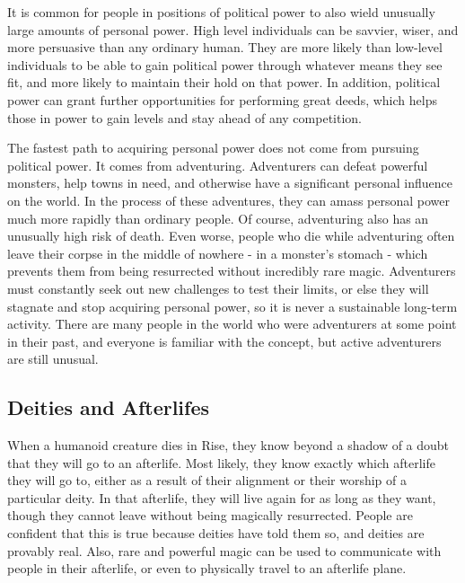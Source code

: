         It is common for people in positions of political power to also wield unusually large amounts of personal power.
        High level individuals can be savvier, wiser, and more persuasive than any ordinary human.
        They are more likely than low-level individuals to be able to gain political power through whatever means they see fit, and more likely to maintain their hold on that power.
        In addition, political power can grant further opportunities for performing great deeds, which helps those in power to gain levels and stay ahead of any competition.

        The fastest path to acquiring personal power does not come from pursuing political power.
        It comes from adventuring.
        Adventurers can defeat powerful monsters, help towns in need, and otherwise have a significant personal influence on the world.
        In the process of these adventures, they can amass personal power much more rapidly than ordinary people.
        Of course, adventuring also has an unusually high risk of death.
        Even worse, people who die while adventuring often leave their corpse in the middle of nowhere - in a monster's stomach - which prevents them from being resurrected without incredibly rare magic.
        Adventurers must constantly seek out new challenges to test their limits, or else they will stagnate and stop acquiring personal power, so it is never a sustainable long-term activity.
        There are many people in the world who were adventurers at some point in their past, and everyone is familiar with the concept, but active adventurers are still unusual.

    \subsection{Deities and Afterlifes}\label{Deities and Afterlifes}
        When a humanoid creature dies in Rise, they know beyond a shadow of a doubt that they will go to an afterlife.
        Most likely, they know exactly which afterlife they will go to, either as a result of their alignment or their worship of a particular deity.
        In that afterlife, they will live again for as long as they want, though they cannot leave without being magically resurrected.
        People are confident that this is true because deities have told them so, and deities are provably real.
        Also, rare and powerful magic can be used to communicate with people in their afterlife, or even to physically travel to an afterlife plane.

